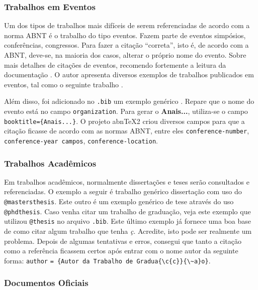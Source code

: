 \documentclass[
  12pt,		%
  a4paper,	%
  openright,%
  oneside,	%
  chapter=TITLE,		%
  section=TITLE,		%
  english,	%
  french,	%
  spanish,	%
  brazil
]{abntex2}
\begin{document}
         \subsubsection{Trabalhos em Eventos}
         
            Um dos tipos de trabalhos mais difíceis de serem referenciadas de acordo com a norma ABNT é o trabalho do tipo eventos. Fazem parte de eventos simpósios, conferências, congressos. Para fazer a citação ``correta'', isto é, de acordo com a ABNT, deve-se, na maioria dos casos, alterar o próprio nome do evento.  Sobre mais detalhes de citações de eventos, recomendo fortemente a leitura da documentação . O autor apresenta diversos exemplos de trabalhos publicados em eventos, tal como o seguinte trabalho \cite{martin1997}.
            
            Além disso, foi adicionado no \verb|.bib| um exemplo genérico   \cite{inproceedings}. Repare que o nome do evento está no campo \verb|organization|. Para gerar o \textbf{Anais...}, utiliza-se o campo \verb|booktitle={Anais...}|. O projeto abn\TeX2{} criou diversos campos para que a citação ficasse de acordo com as normas ABNT, entre eles \verb|conference-number|, \verb|conference-year campos|, \verb|conference-location|.
        
         \subsubsection{Trabalhos Acadêmicos}
            
            Em trabalhos acadêmicos, normalmente dissertações e teses serão consultados e referenciadas. O exemplo a seguir é trabalho genérico dissertação \cite{teseMestrado} com uso do \verb|@mastersthesis|. Este outro é um exemplo genérico de tese \cite{teseDoutorado} através do uso \verb|@phdthesis|. Caso venha citar um trabalho de graduação, veja este exemplo \cite{trabalhoGraduacao} que utilizou \verb|@thesis| no arquivo \verb|.bib|. Este último exemplo já fornece uma boa base de como citar algum trabalho que tenha \emph{ç}. Acredite, isto pode ser realmente um problema. Depois de algumas tentativas e erros, consegui que tanto a citação como a referência ficassem certos após entrar com o nome autor da seguinte forma: \verb|author| \verb|= {Autor da Trabalho de Gradua{\c{c}}{\~a}o}|.
         
         \subsubsection{Documentos Oficiais}
            
\end{document}
